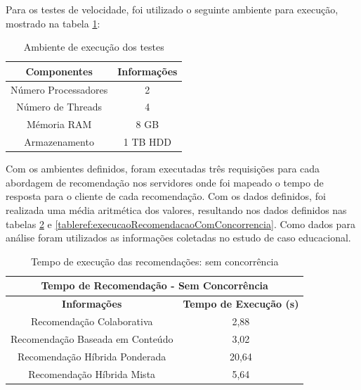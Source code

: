 Para os testes de velocidade, foi utilizado o seguinte ambiente para execução, mostrado na tabela \ref{tableref:ambienteTeste}:

\begin{table}[H]
\centering
\begin{tabular}{|c|c|}
\hline
\textbf{Componentes} & \textbf{Informações} \\ \hline
Número Processadores & 2                               \\ \hline
Número de Threads    & 4                               \\ \hline
Mémoria RAM          & 8 GB                            \\ \hline
Armazenamento        & 1 TB HDD                        \\ \hline
\end{tabular}
\caption{Ambiente de execução dos testes}
\label{tableref:ambienteTeste}
\end{table}

Com os ambientes definidos, foram executadas três requisições para cada abordagem de recomendação nos servidores onde foi mapeado o tempo de resposta para o cliente de cada recomendação. Com os dados definidos, foi realizada uma média aritmética dos valores, resultando nos dados definidos nas tabelas \ref{tableref:execucaoRecomendacaoSemConcorrencia} e \ref{tableref:execucaoRecomendacaoComConcorrencia}. Como dados para análise foram utilizados as informações coletadas no estudo de caso educacional.

\begin{table}[H]
\centering
\begin{tabular}{|c|c|}
\hline
\multicolumn{2}{|c|}{\textbf{Tempo de Recomendação - Sem Concorrência}} \\ \hline
\textbf{Informações}                 & \textbf{Tempo de Execução (s)}    \\ \hline
Recomendação Colaborativa            & 2,88                               \\ \hline
Recomendação Baseada em Conteúdo     & 3,02                               \\ \hline
Recomendação Híbrida Ponderada       & 20,64                              \\ \hline
Recomendação Híbrida Mista           & 5,64                               \\ \hline
\end{tabular}
\caption{Tempo de execução das recomendações: sem concorrência}
\label{tableref:execucaoRecomendacaoSemConcorrencia}
\end{table}

